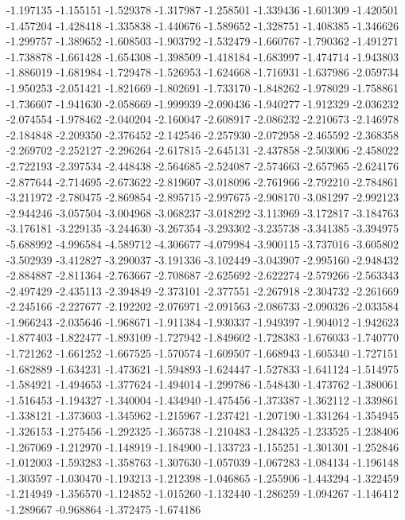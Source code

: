 -1.197135
-1.155151
-1.529378
-1.317987
-1.258501
-1.339436
-1.601309
-1.420501
-1.457204
-1.428418
-1.335838
-1.440676
-1.589652
-1.328751
-1.408385
-1.346626
-1.299757
-1.389652
-1.608503
-1.903792
-1.532479
-1.660767
-1.790362
-1.491271
-1.738878
-1.661428
-1.654308
-1.398509
-1.418184
-1.683997
-1.474714
-1.943803
-1.886019
-1.681984
-1.729478
-1.526953
-1.624668
-1.716931
-1.637986
-2.059734
-1.950253
-2.051421
-1.821669
-1.802691
-1.733170
-1.848262
-1.978029
-1.758861
-1.736607
-1.941630
-2.058669
-1.999939
-2.090436
-1.940277
-1.912329
-2.036232
-2.074554
-1.978462
-2.040204
-2.160047
-2.608917
-2.086232
-2.210673
-2.146978
-2.184848
-2.209350
-2.376452
-2.142546
-2.257930
-2.072958
-2.465592
-2.368358
-2.269702
-2.252127
-2.296264
-2.617815
-2.645131
-2.437858
-2.503006
-2.458022
-2.722193
-2.397534
-2.448438
-2.564685
-2.524087
-2.574663
-2.657965
-2.624176
-2.877644
-2.714695
-2.673622
-2.819607
-3.018096
-2.761966
-2.792210
-2.784861
-3.211972
-2.780475
-2.869854
-2.895715
-2.997675
-2.908170
-3.081297
-2.992123
-2.944246
-3.057504
-3.004968
-3.068237
-3.018292
-3.113969
-3.172817
-3.184763
-3.176181
-3.229135
-3.244630
-3.267354
-3.293302
-3.235738
-3.341385
-3.394975
-5.688992
-4.996584
-4.589712
-4.306677
-4.079984
-3.900115
-3.737016
-3.605802
-3.502939
-3.412827
-3.290037
-3.191336
-3.102449
-3.043907
-2.995160
-2.948432
-2.884887
-2.811364
-2.763667
-2.708687
-2.625692
-2.622274
-2.579266
-2.563343
-2.497429
-2.435113
-2.394849
-2.373101
-2.377551
-2.267918
-2.304732
-2.261669
-2.245166
-2.227677
-2.192202
-2.076971
-2.091563
-2.086733
-2.090326
-2.033584
-1.966243
-2.035646
-1.968671
-1.911384
-1.930337
-1.949397
-1.904012
-1.942623
-1.877403
-1.822477
-1.893109
-1.727942
-1.849602
-1.728383
-1.676033
-1.740770
-1.721262
-1.661252
-1.667525
-1.570574
-1.609507
-1.668943
-1.605340
-1.727151
-1.682889
-1.634231
-1.473621
-1.594893
-1.624447
-1.527833
-1.641124
-1.514975
-1.584921
-1.494653
-1.377624
-1.494014
-1.299786
-1.548430
-1.473762
-1.380061
-1.516453
-1.194327
-1.340004
-1.434940
-1.475456
-1.373387
-1.362112
-1.339861
-1.338121
-1.373603
-1.345962
-1.215967
-1.237421
-1.207190
-1.331264
-1.354945
-1.326153
-1.275456
-1.292325
-1.365738
-1.210483
-1.284325
-1.233525
-1.238406
-1.267069
-1.212970
-1.148919
-1.184900
-1.133723
-1.155251
-1.301301
-1.252846
-1.012003
-1.593283
-1.358763
-1.307630
-1.057039
-1.067283
-1.084134
-1.196148
-1.303597
-1.030470
-1.193213
-1.212398
-1.046865
-1.255906
-1.443294
-1.322459
-1.214949
-1.356570
-1.124852
-1.015260
-1.132440
-1.286259
-1.094267
-1.146412
-1.289667
-0.968864
-1.372475
-1.674186
